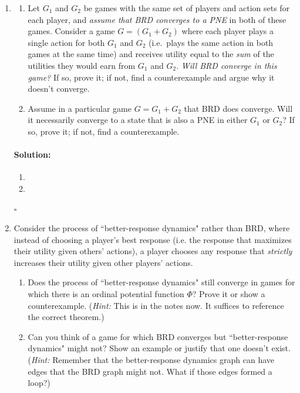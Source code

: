 \documentclass[11pt,letterpaper]{article}
\newif \iftemplate \templatetrue
\newenvironment{solution}{\paragraph{Solution:}}{\hfill$\square$}
\theoremstyle{definition}
\begin{document}
\begin{enumerate}

\item 
\begin{enumerate}
\item Let $G_1$ and $G_2$ be games with the same set of players and action sets for each player, and \emph{assume that BRD converges to a PNE} in both of these games. 
Consider a game $G = (G_1 + G_2)$ where each player plays a single action
for both $G_1$ and $G_2$ (i.e.\ plays the same action in both games at the same time) and receives utility equal to the \emph{sum} of the utilities they would earn from $G_1$ and $G_2$. \emph{Will BRD converge in this game?} If so, prove it; if not, find a counterexample and argue why it doesn't converge. 
\item Assume in a particular game $G = G_1 + G_2$ that BRD does converge. 
Will it necessarily converge to a state that is also a PNE in either $G_1$ or $G_2$? If so, prove it; if not, find a counterexample. 
\end{enumerate}

\iftemplate
\begin{solution}
\begin{enumerate}[label=(\alph*)]
\item 
\item 
\end{enumerate}
\end{solution}
\newpage
\fi

\item Consider the process of ``better-response dynamics" rather than BRD, where instead of choosing a player's best response (i.e. the response that maximizes their utility given others' actions), a player chooses any response that \emph{strictly} increases their utility given other players' actions.
\begin{enumerate}
\item Does the process of ``better-response dynamics" still converge in games for which there is an ordinal potential function $\Phi$? Prove it or show a counterexample. (\emph{Hint:} This is in the notes now. It suffices to reference the correct theorem.)
\item Can you think of a game for which BRD converges but ``better-response dynamics" might not? Show an example or justify that one doesn't exist. (\emph{Hint:} Remember that the better-response dynamics graph can have edges that the BRD graph might not. What if those edges formed a loop?)
\end{enumerate}


\end{enumerate}
\end{document}
